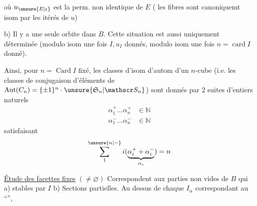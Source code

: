 où $u_{\unsure{E|\varepsilon}}$ est la  perm. non identique de $E$ ( les fibres sont canoniquemt isom par les itérés de $u$)

b) Il y a une seule orbite dans $B$. Cette situation est aussi uniquement déterminée (modulo isom  une fois $I,u_I$ donnés, modulo isom une fois $n=\operatorname{card}I$ donné).


Ainsi, pour $n=\operatorname{Card}I$ fixé, les classes d'isom d'autom d'un $n$-cube (i.e. les classes de conjugaison d'éléments de $\operatorname{Aut}(C_n)=\{\pm1\}^n\cdot\unsure{\mathfrak S_n|\mathscr S_n}$) sont donnés par 2 suites d'entiers naturels
\[
\begin{aligned}
\alpha_1^+\ldots\alpha_n^+&\in\mathbb N\\
\alpha_1^-\ldots\alpha_n^-&\in\mathbb N
\end{aligned}
\]
satisfaisant
\[
\sum_1^{\unsure{n|\relbar}}i(\underbrace{\alpha_i^++\alpha_i^-}_{\alpha_i})=n
\]

\uline{Étude des facettes fixes} $(\ne\varnothing)$  Correspondent aux parties non vides  de $B$ qui a) stables par $I$ b) Sections partielles. Au dessus de chaque $I_\alpha$ correspondant au ``'',
